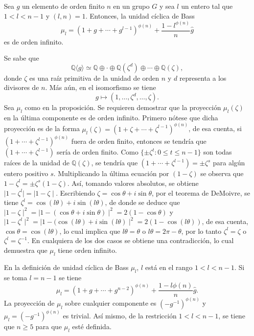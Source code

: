 \begin{proposicion}\label{prop:basscyclic}
Sea $g$ un elemento de orden finito $n$ en un grupo $G$ y sea $l$ un entero tal que $1<l<n-1$ y $(l,n) = 1$. Entonces, la unidad cíclica de Bass \[  \mu_l  = (1+g+\cdots+g^{l-1})^{\phi(n)} + \frac{1-l^{\phi(n)}}{n}\hat{g} \] es de orden infinito. 
\end{proposicion}
\begin{proof*}
Se sabe que \[ \mathds{Q}\langle g \rangle \simeq \mathds{Q} \oplus \cdot \oplus \mathds{Q}(\zeta^d) \oplus \cdots \oplus \mathds{Q}(\zeta),\] donde $\zeta$ es una raíz primitiva de la unidad de orden $n$ y $d$ representa a los divisores de $n$. Más aún, en el isomorfismo se tiene \[ g \mapsto (1, \dots , \zeta^d, \dots , \zeta).\] Sea $\mu_l$ como en la proposición. Se requieren demostrar que la proyección $\mu_l(\zeta)$ en la última componente es de orden infinito. Primero nótese que dicha proyección  es de la forma $\mu_l(\zeta) = (1+\zeta+\cdots+\zeta^{l-1})^{\phi(n)}$, de esa cuenta, si $(1+\cdots + \zeta^{l-1})^{\phi(n)}$ fuera de orden finito, entonces se tendría que $(1+\cdots + \zeta^{l-1})$ sería de orden finito. Como $\{ \pm \zeta^t \colon 0\leq t\leq n-1 \}$ son todas raíces de la unidad de $\mathds{Q}(\zeta)$, se tendría que $(1+\cdots +\zeta^{l-1}) = \pm \zeta^s$ para algún entero positivo $s$. Multiplicando la última ecuación por $(1-\zeta)$ se observa que $1-\zeta^l = \pm \zeta^s(1-\zeta)$. Así, tomando valores absolutos, se obtiene $\mid 1 - \zeta^l \mid = \mid 1-\zeta \mid$. Escribiendo $\zeta = \cos \theta + i \sin \theta$, por el teorema de DeMoivre, se tiene $\zeta^l = \cos(l\theta) + i \sin(l\theta)$, de donde se deduce que $\mid 1 - \zeta \mid^2 = \mid 1 - (\cos\theta + i \sin\theta) \mid ^2 = 2(1-\cos\theta)$ y $\mid 1-\zeta^l \mid^2 = \mid 1-(\cos(l\theta) + i\sin(l\theta)  \mid^2 = 2(1-\cos(l\theta))$, de esa cuenta, $\cos\theta = \cos (l\theta)$, lo cual implica que $l\theta = \theta$ o $l\theta = 2\pi-\theta$, por lo tanto $\zeta^l = \zeta$ o $\zeta^l = \zeta^{-1}$. En cualquiera de los dos casos se obtiene una contradicción, lo cual demuestra que $\mu_l$ tiene orden infinito.
\end{proof*}
\begin{nota}
En la definición de unidad cíclica de Bass $\mu_l$, $l$ está en el rango $1<l<n-1$. Si se toma $l=n-1$ se tiene \[ \mu_l= (1+g+\cdots+g^{n-2})^{\phi(n)}+\frac{1-l {\phi(n)}}{n}\hat{g}.\] La proyección de $\mu_l$ sobre cualquier componente es $(-g^{-1})^{\phi(n)}$ y $\mu_l = (-g^{-1})^{\phi(n)}$ es trivial. Así mismo, de la restricción $1<l<n-1$, se tiene que $n\geq 5$ para que $\mu_l$ esté definida.
\end{nota}
